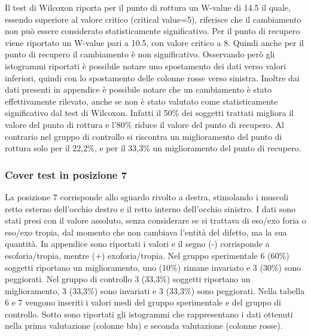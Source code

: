 Il test di Wilcoxon riporta per il punto di rottura un W-value di 14.5 il quale, essendo superiore al valore critico (critical value=5), riferisce che il cambiamento non può essere considerato statisticamente significativo. Per il punto di recupero viene riportato un W-value pari a 10.5, con valore critico a 8. Quindi anche per il punto di recupero il cambiamento è non significativo. Osservando però gli istogrammi riportati è possibile notare uno spostamento dei dati verso valori inferiori, quindi con lo spostamento delle colonne rosse verso sinistra. Inoltre dai dati presenti in appendice è possibile notare che un cambiamento è stato effettivamente rilevato, anche se non è stato valutato come statisticamente significativo dal test di Wilcoxon. Infatti il 50\% dei soggetti trattati migliora il valore del punto di rottura e l’80\% riduce il valore del punto di recupero. Al contrario nel gruppo di controllo si riscontra un miglioramento del punto di rottura solo per il 22,2\%, e per il 33,3\% un miglioramento del punto di recupero.


\subsubsection{Cover test in posizione 7}

La posizione 7 corrisponde allo sguardo rivolto a destra, stimolando i muscoli retto esterno dell’occhio destro e il retto interno dell’occhio sinistro. I dati sono stati presi con il valore assoluto, senza considerare se si trattava di eso/exo foria o eso/exo tropia, dal momento che non cambiava l’entità del difetto, ma la sua quantità. In appendice sono riportati i valori e il segno (-) corrisponde a esoforia/tropia, mentre (+) exoforia/tropia. Nel gruppo sperimentale 6 (60\%) soggetti riportano un miglioramento, uno (10\%) rimane invariato e 3 (30\%) sono peggiorati. Nel gruppo di controllo 3 (33,3\%) soggetti riportano un miglioramento, 3 (33,3\%) sono invariati e 3 (33,3\%) sono peggiorati. Nella tabella 6 e 7 vengono inseriti i valori medi del gruppo sperimentale e del gruppo di controllo. Sotto sono riportati gli istogrammi che rappresentano i dati ottenuti nella prima valutazione (colonne blu) e seconda valutazione (colonne rosse).

